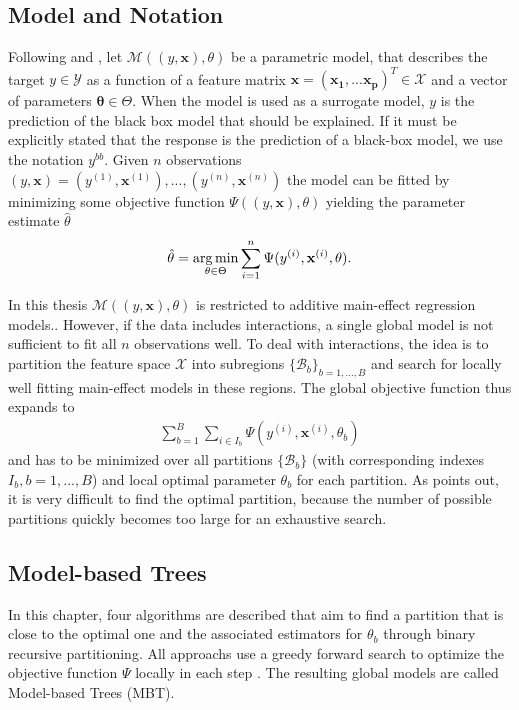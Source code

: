 \subsection{Model and Notation}
Following \citep{Zeileis.2008} and \citep{Seibold.2016}, let $\mathcal{M}((y, \mathbf{x}), \theta)$ be a parametric model, that describes the target $y \in \mathcal{Y}$ as a function of a feature matrix $\mathbf{x} = (\mathbf{x_1}, ... \mathbf{x_p})^T \in \mathcal{X}$  and a vector of parameters $\mathbf{\theta} \in \Theta$. When the model is used as a surrogate model, $y$ is the prediction of the black box model that should be explained.  If it must be explicitly stated that the response is the prediction of a black-box model, we use the notation $y^{bb}$. Given $n$ observations $(y, \mathbf{x}) = (y^{(1)}, \mathbf{x}^{(1)}),..., (y^{(n)}, \mathbf{x}^{(n)})$ the model can be fitted by minimizing some objective function $\Psi((y, \mathbf{x}), \theta)$ yielding the parameter estimate $\hat{\theta}$
\begin{align}
    \hat{\mathbf{\theta}} = \operatorname*{arg\,min}_{\theta \in \Theta} \sum_{i=1}^{n}\Psi(y^{(i)}, \mathbf{x}^{(i)}, \theta).
\end{align}

In this thesis $\mathcal{M}((y, \mathbf{x}), \theta)$ is restricted to additive main-effect regression models.. However, if the data includes interactions, a single global model is not sufficient to fit all $n$ observations well.  To deal with interactions, the idea is to partition the feature space $\mathcal{X}$ into subregions $\{\mathcal{B}_b\}_{b = 1,...,B}$ and search for locally well fitting main-effect models in these regions. The global objective function thus expands to
\begin{align}
    \sum_{b=1}^B\sum_{i \in I_b}\Psi(y^{(i)}, \mathbf{x}^{(i)}, \theta_b)
\end{align}
and has to be minimized over all partitions $\{\mathcal{B}_b\}$ (with corresponding indexes $I_b, b = 1,...,B$) and local optimal parameter $\theta_b$ for each partition. As \citep{Zeileis.2008} points out, it is very difficult to find the optimal partition, because the number of possible partitions quickly becomes too large for an exhaustive search.





\subsection{Model-based Trees}
In this chapter, four algorithms are described that aim to find a partition that is close to the optimal one and the associated estimators for $\theta_b$ through binary recursive partitioning. All approachs use a greedy forward search to optimize the objective function $\Psi$ locally in each step \citep{Zeileis.2008}.  
The resulting global models are called Model-based Trees (MBT).




